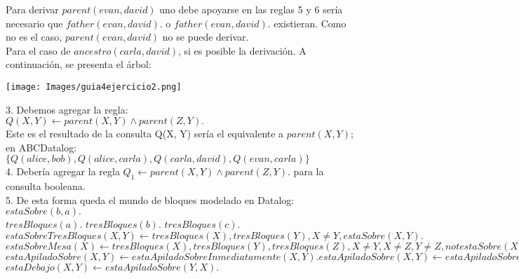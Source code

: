 Para derivar $parent(evan, david)$ uno debe apoyarse en las reglas 5 y 6 sería necesario que $father(evan, david).$ o $father(evan, david).$ existieran. Como no es el caso, $parent(evan, david)$ no se puede derivar. \\

Para el caso de $ancestro(carla, david)$, si es posible la derivación. A continuación, se presenta el árbol: \\

\begin{center}
	\texttt{[image: Images/guia4ejercicio2.png]}
	\label{fig:overview}
\end{center}



3. Debemos agregar la regla: \\

$Q(X, Y) \gets parent(X, Y) \land parent(Z, Y).$\\

Este es el resultado de la consulta Q(X, Y) sería el equivalente a $parent(X, Y)$; en ABCDatalog: \\

$\{Q(alice, bob), Q(alice, carla), Q(carla, david), Q(evan, carla)\}$ \\

4. Debería agregar la regla $Q_{1} \gets parent(X, Y) \land parent(Z, Y).$ para la consulta booleana. \\

5. De esta forma queda el mundo de bloques modelado en Datalog: \\

$estaSobre(b, a).$\\

$tresBloques(a).$
$tresBloques(b).$
$tresBloques(c).$\\

$estaSobreTresBloques(X, Y) \gets tresBloques(X), tresBloques(Y), X \neq Y, estaSobre(X, Y).$ \\

$estaSobreMesa(X) \gets tresBloques(X), tresBloques(Y), tresBloques(Z), X \neq Y,  X \neq Z, Y \neq Z, not estaSobre(X, Y), not estaSobre(X, Z).$\\

$estaApiladoSobre(X, Y) \gets estaApiladoSobreInmediatamente(X, Y).
estaApiladoSobre(X, Y) \gets estaApiladoSobre(X, Z), estaApiladoSobre(Z, Y).$\\

$estaDebajo(X, Y) \gets estaApiladoSobre(Y, X).$\\


